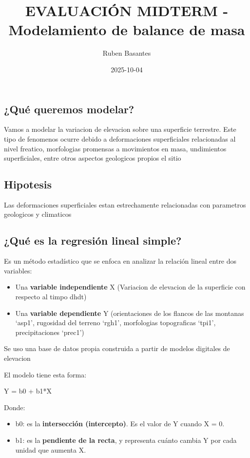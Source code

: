 \documentclass[
  letterpaper,
  DIV=11,
  numbers=noendperiod]{scrartcl}
\title{EVALUACIÓN MIDTERM - Modelamiento de balance de masa}
\author{Ruben Basantes}
\date{2025-10-04}
\providecommand{\tightlist}{%
  \setlength{\itemsep}{0pt}\setlength{\parskip}{0pt}}
\begin{document}
\maketitle


\subsection{¿Qué queremos modelar?}\label{quuxe9-queremos-modelar}

Vamos a modelar la variacion de elevacion sobre una superficie
terrestre. Este tipo de fenomenos ocurre debido a deformaciones
superficiales relacionadas al nivel freatico, morfologias promensas a
movimientos en masa, undimientos superficiales, entre otros aspectos
geologicos propios el sitio

\subsection{Hipotesis}\label{hipotesis}

Las deformaciones superficiales estan estrechamente relacionadas con
parametros geologicos y climaticos

\subsection{¿Qué es la regresión lineal
simple?}\label{quuxe9-es-la-regresiuxf3n-lineal-simple}

Es un método estadístico que se enfoca en analizar la relación lineal
entre dos variables:

\begin{itemize}
\tightlist
\item
  Una \textbf{variable independiente} X (Variacion de elevacion de la
  superficie con respecto al timpo dhdt)
\item
  Una \textbf{variable dependiente} Y (orientaciones de los flancos de
  las montanas `asp1', rugosidad del terreno `rgh1', morfologias
  topograficas `tpi1', precipitaciones `prec1')
\end{itemize}

Se uso una base de datos propia construida a partir de modelos digitales
de elevacion

El modelo tiene esta forma:

Y = b0 + b1*X

Donde:

\begin{itemize}
\tightlist
\item
  b0: es la \textbf{intersección (intercepto)}. Es el valor de Y cuando
  X = 0.\\
\item
  b1: es la \textbf{pendiente de la recta}, y representa cuánto cambia Y
  por cada unidad que aumenta X.
\end{itemize}
\end{document}

